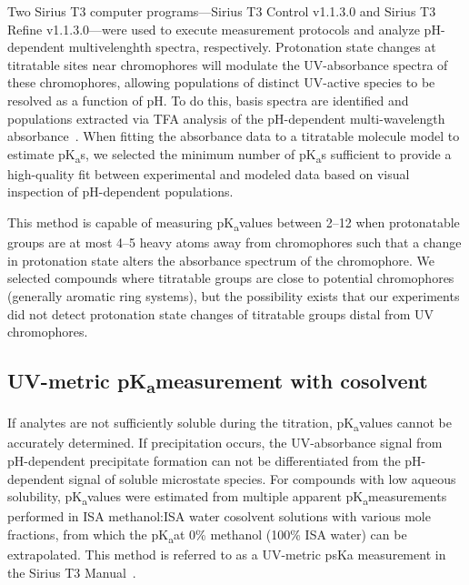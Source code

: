\documentclass[9pt,lineno]{elife}
\newcommand{\pKa}{pK\textsubscript{a}}
\begin{document}
Two Sirius T3 computer programs---Sirius T3 Control v1.1.3.0 and Sirius T3 Refine v1.1.3.0---were used to execute measurement protocols and analyze pH-dependent multivelenghth spectra, respectively.
Protonation state changes at titratable sites near chromophores will modulate the UV-absorbance spectra of these chromophores, allowing populations of distinct UV-active species to be resolved as a function of pH. 
To do this, basis spectra are identified and populations extracted via TFA analysis of the pH-dependent multi-wavelength absorbance~\citep{allen_multiwavelength_1998}. 
When fitting the absorbance data to a titratable molecule model to estimate \pKa s, we selected the minimum number of \pKa s sufficient to provide a high-quality fit between experimental and modeled data based on visual inspection of pH-dependent populations.

This method is capable of measuring \pKa values between 2--12 when protonatable groups are at most 4--5 heavy atoms away from chromophores such that a change in protonation state alters the absorbance spectrum of the chromophore. 
We selected compounds where titratable groups are close to potential chromophores (generally aromatic ring systems), but the possibility exists that our experiments did not detect protonation state changes of titratable groups distal from UV chromophores.

\subsection{UV-metric \pKa measurement with cosolvent}

If analytes are not sufficiently soluble during the titration, \pKa values cannot be accurately determined. 
If precipitation occurs, the UV-absorbance signal from pH-dependent precipitate formation can not be differentiated from the pH-dependent signal of soluble microstate species. 
For compounds with low aqueous solubility, \pKa values were estimated from multiple apparent \pKa measurements performed in ISA methanol:ISA water cosolvent solutions with various mole fractions, from which the \pKa at 0\% methanol (100\% ISA water) can be extrapolated. 
This method is referred to as a UV-metric psKa measurement in the Sirius T3 Manual~\citep{noauthor_sirius_2008}.
\end{document}
